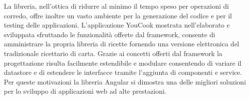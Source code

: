 \newline 
La libreria, nell'ottica di ridurre al minimo il tempo speso per operazioni di corredo, offre inoltre un vasto ambiente per la generazione del codice e per il testing delle applicazioni.
\newline 
L'applicazione YouCook mostrata nell'elaborato e sviluppata sfruttando le funzionalità offerte dal framework, consente di amministrare la propria libreria di ricette fornendo una versione elettronica del tradizionale ricettario di carta.
Grazie ai concetti offerti dal framework la progettazione risulta facilmente estendibile e modulare consentendo di variare il datastore e di estendere le interfacce tramite l'aggiunta di componenti e service.
\newline 
Per queste motivazioni la libreria Angular si dimostra una delle migliori soluzioni per lo sviluppo di applicazioni web ad alte prestazioni.

